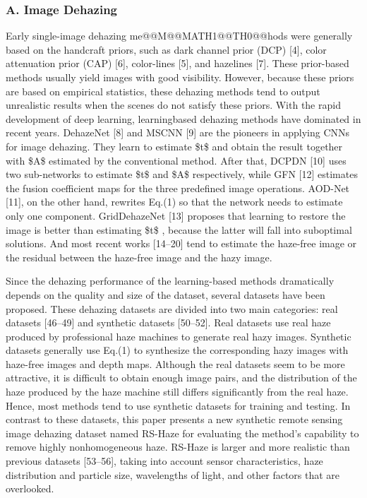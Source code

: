 \subsubsection{A. Image Dehazing}

Early single-image dehazing me@@M@@MATH1@@TH0@@hods were generally based on the handcraft priors, such as dark channel prior (DCP) [4], color attenuation prior (CAP) [6], color-lines [5], and hazelines [7]. These prior-based methods usually yield images with good visibility. However, because these priors are based on empirical statistics, these dehazing methods tend to output unrealistic results when the scenes do not satisfy these priors. With the rapid development of deep learning, learningbased dehazing methods have dominated in recent years. DehazeNet [8] and MSCNN [9] are the pioneers in applying CNNs for image dehazing. They learn to estimate \$t\$ and obtain the result together with \$A\$ estimated by the conventional method. After that, DCPDN [10] uses two sub-networks to estimate \$t\$ and \$A\$ respectively, while GFN [12] estimates the fusion coefficient maps for the three predefined image operations. AOD-Net [11], on the other hand, rewrites Eq.(1) so that the network needs to estimate only one component. GridDehazeNet [13] proposes that learning to restore the image is better than estimating \$t\$ , because the latter will fall into suboptimal solutions. And most recent works [14–20] tend to estimate the haze-free image or the residual between the haze-free image and the hazy image.

Since the dehazing performance of the learning-based methods dramatically depends on the quality and size of the dataset, several datasets have been proposed. These dehazing datasets are divided into two main categories: real datasets [46–49] and synthetic datasets [50–52]. Real datasets use real haze produced by professional haze machines to generate real hazy images. Synthetic datasets generally use Eq.(1) to synthesize the corresponding hazy images with haze-free images and depth maps. Although the real datasets seem to be more attractive, it is difficult to obtain enough image pairs, and the distribution of the haze produced by the haze machine still differs significantly from the real haze. Hence, most methods tend to use synthetic datasets for training and testing. In contrast to these datasets, this paper presents a new synthetic remote sensing image dehazing dataset named RS-Haze for evaluating the method’s capability to remove highly nonhomogeneous haze. RS-Haze is larger and more realistic than previous datasets [53–56], taking into account sensor characteristics, haze distribution and particle size, wavelengths of light, and other factors that are overlooked.

